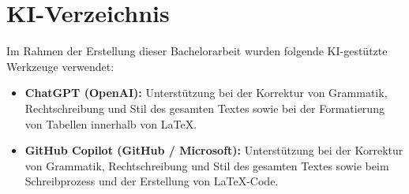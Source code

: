 \section*{KI-Verzeichnis}

Im Rahmen der Erstellung dieser Bachelorarbeit wurden folgende KI-gestützte Werkzeuge verwendet:

\begin{itemize}
    \item \textbf{ChatGPT (OpenAI):}  
    Unterstützung bei der Korrektur von Grammatik, Rechtschreibung und Stil des gesamten Textes sowie bei der Formatierung von Tabellen innerhalb von LaTeX.

    \item \textbf{GitHub Copilot (GitHub / Microsoft):}  
    Unterstützung bei der Korrektur von Grammatik, Rechtschreibung und Stil des gesamten Textes sowie beim Schreibprozess und der Erstellung von LaTeX-Code.
\end{itemize}
